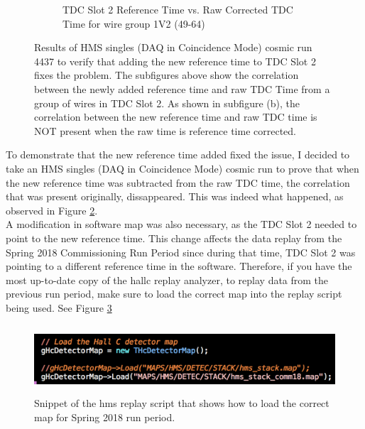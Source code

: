 \documentclass[11pt]{article}
\begin{document}
\begin{figure}[h!]
\begin{subfigure}{.5\textwidth}
  \caption{TDC Slot 2 Reference Time vs. Raw Corrected TDC \\Time for wire group 1V2 (49-64)}
  \label{fig:ref5_uncorrelated}
\end{subfigure}
\caption{Results of HMS singles (DAQ in Coincidence Mode) cosmic run 4437 to verify that adding the new reference time to TDC Slot 2 fixes the problem.
  The subfigures above show the correlation between the newly added reference time and raw TDC Time from a group of wires in TDC Slot 2. As shown in subfigure (b), the correlation
  between the new reference time and raw TDC time is NOT present when the raw time is reference time corrected.}
\label{fig:hdc_Ref5}
\end{figure}
\noindent To demonstrate that the new reference time added fixed the issue, I decided to take an HMS singles (DAQ in Coincidence Mode) cosmic run to prove that when the
new reference time was subtracted from the raw TDC time, the correlation that was present originally, dissappeared. This was indeed what happened, as observed in Figure \ref{fig:hdc_Ref5}.\\
\indent A modification in software map was also necessary, as the TDC Slot 2 needed to point to the new reference time. This change affects the data replay from the
Spring 2018 Commissioning Run Period since during that time, TDC Slot 2 was pointing to a different reference time in the software. Therefore, if you have the most up-to-date copy of the
hallc replay analyzer, to replay data from the previous run period, make sure to load the correct map into the replay script being used. See Figure \ref{fig:map} 

\begin{figure}[h]
  \centering
  \includegraphics[width=5.0in, height=1.0in]{loadmap.png}
  \caption{Snippet of the hms replay script that shows how to load the correct map for Spring 2018 run period.}
  \label{fig:map}
\end{figure}
\newpage
\end{document}
